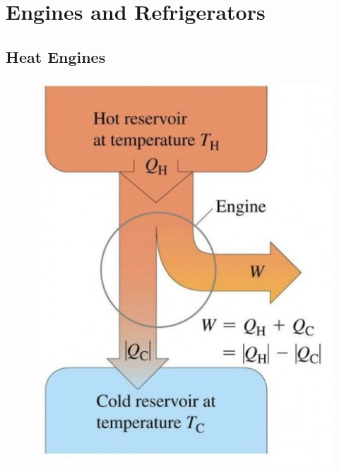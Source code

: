 \documentclass{book}
\begin{document}
\chapter{Engines and Refrigerators}
\label{ch:engines and reg}

\section{Heat Engines}%
\label{sec:heat engines}

\begin{itemize}

	\begin{figure}[ht]
		\centering
		\includegraphics[width=0.15\linewidth]{figures/engine.png}
		\caption{\label{fig:Heat Engine}}
	\end{figure}


\end{itemize}
\end{document}
